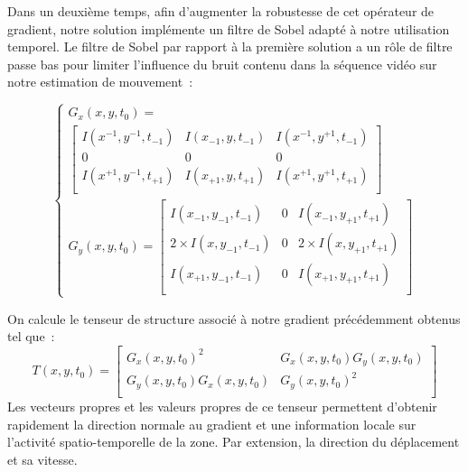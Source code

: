 \documentclass[fleqn,10pt]{SelfArx} %
\begin{document}
Dans un deuxième temps, afin d'augmenter la robustesse de cet opérateur de gradient,
notre solution implémente un filtre de Sobel adapté à notre utilisation temporel.
Le filtre de Sobel par rapport à la première solution a un rôle de filtre passe bas pour limiter 
l'influence du bruit contenu dans la séquence vidéo sur notre estimation de mouvement~:

\[
    \begin{cases}
        G_{x}(x,y,t_{0}) = \\
        \begin{bmatrix}
            I(x^{-1}, y^{-1}, t_{-1}) & I(x_{-1}, y, t_{-1}) & I(x^{-1}, y^{+1}, t_{-1}) \\
            0 & 0 & 0 \\
            I(x^{+1}, y^{-1}, t_{+1}) & I(x_{+1}, y, t_{+1}) & I(x^{+1}, y^{+1}, t_{+1}) \\
        \end{bmatrix} \\
        G_{y}(x,y,t_{0}) = 
        \begin{bmatrix}
                     I(x_{-1}, y_{-1}, t_{-1}) & 0 &          I(x_{-1}, y_{+1}, t_{+1}) \\
            2 \times I(x,      y_{-1}, t_{-1}) & 0 & 2 \times I(x,      y_{+1}, t_{+1}) \\
                     I(x_{+1}, y_{-1}, t_{-1}) & 0 &          I(x_{+1}, y_{+1}, t_{+1}) \\
        \end{bmatrix}
    \end{cases}
\]

On calcule le tenseur de structure associé à notre gradient précédemment obtenus tel que~:
\[
    T(x, y, t_{0}) = 
    \begin{bmatrix}
        G_{x}(x,y,t_{0})^{2} & G_{x}(x,y,t_{0})G_{y}(x,y,t_{0}) \\
        G_{y}(x,y,t_{0})G_{x}(x,y,t_{0}) & G_{y}(x,y,t_{0})^{2} \\
    \end{bmatrix}
\]
Les vecteurs propres et les valeurs propres de ce tenseur permettent d'obtenir rapidement la direction normale
au gradient et une information locale sur l'activité spatio-temporelle de la zone. Par extension, la direction du déplacement et sa vitesse.
\end{document}
